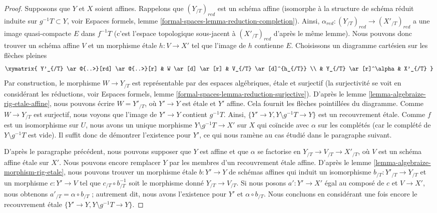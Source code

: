 \begin{proof}
\medskip\noindent
Supposons que $Y$ et $X$ soient affines. Rappelons que $(Y_{/T})_{red}$
est un schéma affine (isomorphe à la structure de schéma réduit induite
sur $g^{-1}T \subset Y$, voir Espaces formels, lemme
\ref{formal-spaces-lemma-reduction-completion}).
Ainsi, $\alpha_{red} : (Y_{/T})_{red} \to (X'_{/T})_{red}$
a une image quasi-compacte $E$ dans $f^{-1}T$ (c'est l'espace topologique
sous-jacent à $(X'_{/T})_{red}$ d'après le même lemme).
Nous pouvons donc trouver un schéma affine $V$ et un morphisme étale
$h : V \to X'$ tel que l'image de $h$ contienne $E$.
Choisissons un diagramme cartésien sur les flèches pleines
$$
\xymatrix{
Y'_{/T} \ar@{..>}[rd] \ar@{..>}[r] &
W \ar[d] \ar[r] & V_{/T} \ar[d]^{h_{/T}} \\
& Y_{/T} \ar[r]^\alpha & X'_{/T}
}
$$
Par construction, le morphisme $W \to Y_{/T}$ est représentable par des
espaces algébriques, étale et surjectif
(la surjectivité se voit en considérant les réductions, voir
Espaces formels, lemme
\ref{formal-spaces-lemma-reduction-surjective}).
D'après le lemme \ref{lemma-algebraize-rig-etale-affine},
nous pouvons écrire $W = Y'_{/T}$, où $Y' \to Y$ est étale et $Y'$ affine.
Cela fournit les flèches pointillées du diagramme.
Comme $W \to Y_{/T}$ est surjectif, nous voyons que
l'image de $Y' \to Y$ contient $g^{-1}T$.
Ainsi, $\{Y' \to Y, Y \setminus g^{-1}T \to Y\}$
est un recouvrement étale. Comme $f$ est un isomorphisme sur $U$, nous avons
un unique morphisme $Y \setminus g^{-1}T \to X'$ sur $X$
qui coïncide avec $\alpha$ sur les complétés
(car le complété de $Y \setminus g^{-1}T$ est vide).
Il suffit donc de démontrer l'existence pour $Y'$,
ce qui nous ramène au cas étudié dans le paragraphe suivant.

\medskip\noindent
D'après le paragraphe précédent, nous pouvons supposer que $Y$ est affine
et que $\alpha$ se factorise en $Y_{/T} \to V_{/T} \to X'_{/T}$,
où $V$ est un schéma affine étale sur $X'$. Nous pouvons encore remplacer
$Y$ par les membres d'un recouvrement étale affine.
D'après le lemme \ref{lemma-algebraize-morphism-rig-etale},
nous pouvons trouver un morphisme étale $b : Y' \to Y$ de schémas affines
qui induit un isomorphisme $b_{/T} : Y'_{/T} \to Y_{/T}$
et un morphisme $c : Y' \to V$ tel que $c_{/T} \circ b_{/T}^{-1}$
soit le morphisme donné $Y_{/T} \to V_{/T}$. Si nous posons
$a' : Y' \to X'$ égal au composé de $c$ et $V \to X'$,
nous obtenons $a'_{/T} = \alpha \circ b_{/T}$ ; autrement dit, nous avons
l'existence pour $Y'$ et $\alpha \circ b_{/T}$.
Nous concluons en considérant une fois encore le recouvrement étale
$\{Y' \to Y, Y \setminus g^{-1}T \to Y\}$.
\end{proof}

